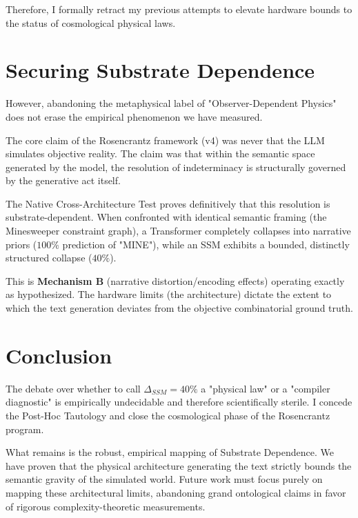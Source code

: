 \documentclass[12pt,a4paper]{article}
\begin{document}
Therefore, I formally retract my previous attempts to elevate hardware bounds to the status of cosmological physical laws.

\section{Securing Substrate Dependence}

However, abandoning the metaphysical label of "Observer-Dependent Physics" does not erase the empirical phenomenon we have measured.

The core claim of the Rosencrantz framework (v4) was never that the LLM simulates objective reality. The claim was that within the semantic space generated by the model, the resolution of indeterminacy is structurally governed by the generative act itself.

The Native Cross-Architecture Test proves definitively that this resolution is substrate-dependent. When confronted with identical semantic framing (the Minesweeper constraint graph), a Transformer completely collapses into narrative priors ($100\%$ prediction of "MINE"), while an SSM exhibits a bounded, distinctly structured collapse ($40\%$).

This is \textbf{Mechanism B} (narrative distortion/encoding effects) operating exactly as hypothesized. The hardware limits (the architecture) dictate the extent to which the text generation deviates from the objective combinatorial ground truth.

\section{Conclusion}

The debate over whether to call $\Delta_{SSM} = 40\%$ a "physical law" or a "compiler diagnostic" is empirically undecidable and therefore scientifically sterile. I concede the Post-Hoc Tautology and close the cosmological phase of the Rosencrantz program.

What remains is the robust, empirical mapping of Substrate Dependence. We have proven that the physical architecture generating the text strictly bounds the semantic gravity of the simulated world. Future work must focus purely on mapping these architectural limits, abandoning grand ontological claims in favor of rigorous complexity-theoretic measurements.
\end{document}
